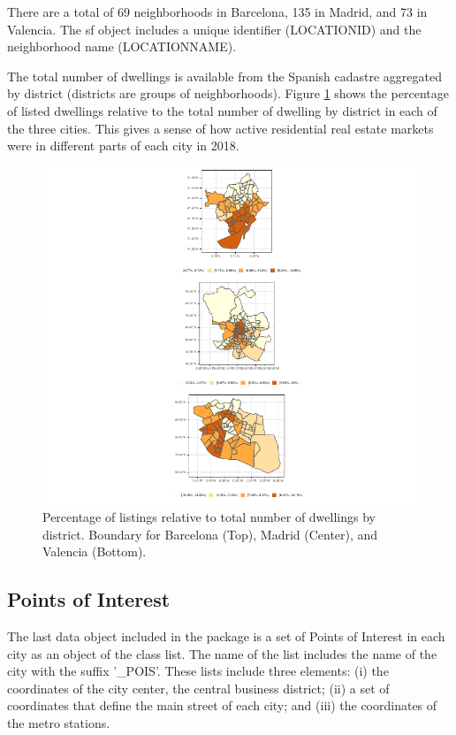 \documentclass[Royal,times,sageh]{sagej}
\begin{document}
There are a total of 69 neighborhoods in Barcelona, 135 in Madrid, and
73 in Valencia. The sf object includes a unique identifier (LOCATIONID)
and the neighborhood name (LOCATIONNAME).

The total number of dwellings is available from the Spanish cadastre
aggregated by district (districts are groups of neighborhoods). Figure
\ref{fig:districts} shows the percentage of listed dwellings relative to
the total number of dwelling by district in each of the three cities.
This gives a sense of how active residential real estate markets were in
different parts of each city in 2018.

\begin{figure}
\centering
\includegraphics{main_EPB_files/figure-latex/unnamed-chunk-2-1.pdf}
\caption{\label{fig:districts}Percentage of listings relative to total
number of dwellings by district. Boundary for Barcelona (Top), Madrid
(Center), and Valencia (Bottom).}
\end{figure}

\hypertarget{points-of-interest}{%
\subsection{Points of Interest}\label{points-of-interest}}

The last data object included in the package is a set of Points of
Interest in each city as an object of the class list. The name of the
list includes the name of the city with the suffix '\_POIS'. These lists
include three elements: (i) the coordinates of the city center, the
central business district; (ii) a set of coordinates that define the
main street of each city; and (iii) the coordinates of the metro
stations.
\end{document}
